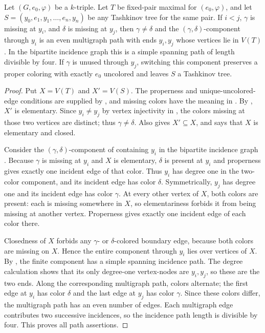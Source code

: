 \begin{lemma}
Let $(G,e_0,\varphi)$ be a $k$-triple.  Let $T$ be fixed-pair maximal for
$(e_0,\varphi)$, and let
$S=(y_0,e_1,y_1,\ldots,e_n,y_n)$ be any Tashkinov tree for the same pair.
If $i<j$, $\gamma$ is missing at $y_i$, and $\delta$ is missing at $y_j$,
then $\gamma\ne\delta$ and the $(\gamma,\delta)$-component through $y_i$
is an even multigraph path with ends $y_i,y_j$ whose vertices lie in
$V(T)$.  In the bipartite incidence graph this is a simple spanning path of
length divisible by four.  If $\gamma$ is unused through $y_j$, switching
this component preserves a proper coloring with exactly $e_0$ uncolored and
leaves $S$ a Tashkinov tree.
\end{lemma}
\begin{proof}
Put $X=V(T)$ and $X'=V(S)$.  The properness and unique-uncolored-edge
conditions are supplied by , and missing colors have the
meaning in .  By , $X'$ is elementary.
Since $y_i\ne y_j$ by vertex injectivity in , the
colors missing at those two vertices are distinct; thus
$\gamma\ne\delta$.  Also  gives
$X'\subseteq X$, and  says that
$X$ is elementary and closed.

Consider the $(\gamma,\delta)$-component of 
containing $y_i$ in the bipartite incidence graph
.  Because $\gamma$ is
missing at $y_i$ and $X$ is elementary, $\delta$ is present at $y_i$ and
properness gives exactly one incident edge of that color.  Thus $y_i$ has
degree one in the two-color component, and its incident edge has color
$\delta$.  Symmetrically, $y_j$ has degree one and its incident edge has
color $\gamma$.  At every other vertex of $X$, both colors are present:
each is missing somewhere in $X$, so elementariness forbids it from being
missing at another vertex.  Properness gives exactly one incident edge of
each color there.

Closedness of $X$ forbids any $\gamma$- or $\delta$-colored boundary edge,
because both colors are missing on $X$.  Hence the entire component through
$y_i$ lies over vertices of $X$.  By
, the finite component has a simple
spanning incidence path.  The degree calculation shows that its only
degree-one vertex-nodes are $y_i,y_j$, so these are the two ends.  Along the
corresponding multigraph path, colors alternate; the first edge at $y_i$
has color $\delta$ and the last edge at $y_j$ has color $\gamma$.  Since
these colors differ, the multigraph path has an even number of edges.  Each
multigraph edge contributes two successive incidences, so the incidence
path length is divisible by four.  This proves all path assertions.


\end{proof}
